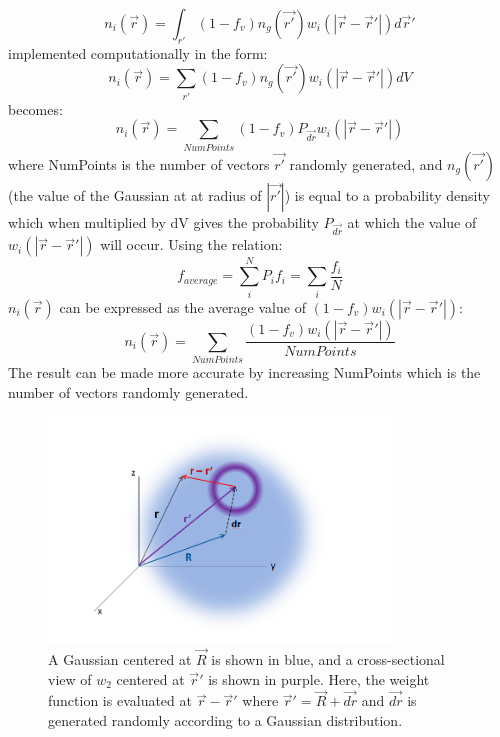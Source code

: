 \documentclass[double,12pt]{beavtex}
\begin{document}
\begin{equation}{n_i(\vec{r})= \int_{r'}{(1-f_v)n_g(\vec{r'})w_i(|\vec{r}-\vec{r}'|)} {d}\vec{r}'}\end{equation} 
implemented computationally in the form:
\begin{equation}{n_i(\vec{r})= \sum_{r'}{(1-f_v)n_g(\vec{r'})w_i(|\vec{r}-\vec{r}'|)dV}}\end{equation} 
becomes:
\begin{equation}{n_i(\vec{r})= \sum_{NumPoints}(1-f_v)P_{\vec{dr}}w_i(|\vec{r}-\vec{r}'|)}\end{equation} 
where NumPoints is the number of vectors $\vec{r'}$ randomly generated, and $n_g(\vec{r'})$ 
(the value of the Gaussian at at radius of $|\vec{r'}|$) is equal to a probability density 
which when multiplied by dV gives the probability $P_{\vec{dr}}$ at which the value of 
$w_i(|\vec{r}-\vec{r}'|)$ will occur. 
Using the relation:
\begin{displaymath}{f_{average}=\sum_i^N{P_if_i}=\sum_i{\frac{f_i}{N}}}\end{displaymath} 
$n_i(\vec{r})$ can be expressed as the average value of $(1-f_v)w_i(|\vec{r}-\vec{r}'|)$:
\begin{equation}{n_i(\vec{r})=\sum_{NumPoints}\frac{(1-f_v)w_i(|\vec{r}-\vec{r}'|)}{NumPoints}}\end{equation}
The result can be made more accurate by increasing NumPoints which is the 
number of vectors randomly generated. 

 \begin{figure}[h!]
    \centering
    \includegraphics[height=6cm]{GaussandW2_actual.png}
    \caption{A Gaussian centered at $\vec{R}$ is shown in blue, and a cross-sectional 
    view of $w_2$ centered at $\vec{r}'$ is shown in purple. Here, the weight function 
    is evaluated at $\vec{r}-\vec{r}'$ where $\vec{r}'=\vec{R}+\vec{dr}$ and $\vec{dr}$ 
    is generated randomly according to a Gaussian distribution.} 
  \label{fig:GaussandW2_actual}
  \end{figure} 
\end{document}

